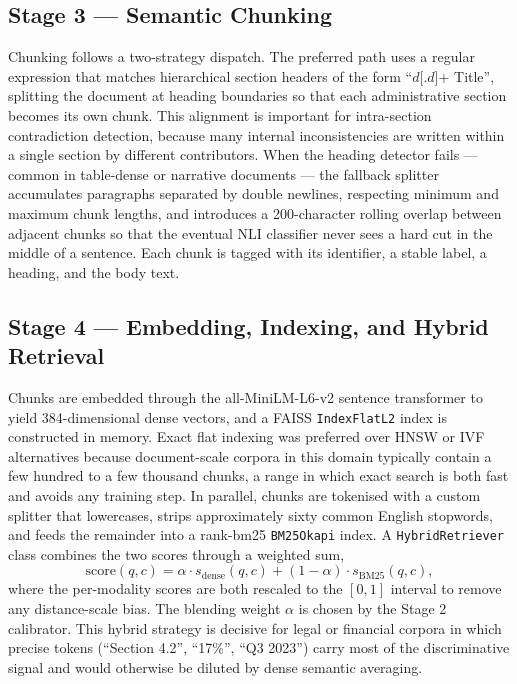 \documentclass[conference]{IEEEtran}
\begin{document}
\subsection{Stage 3 --- Semantic Chunking}
Chunking follows a two-strategy dispatch. The preferred path uses a regular expression that matches hierarchical section headers of the form ``$d$[.$d$]+ Title'', splitting the document at heading boundaries so that each administrative section becomes its own chunk. This alignment is important for intra-section contradiction detection, because many internal inconsistencies are written within a single section by different contributors. When the heading detector fails --- common in table-dense or narrative documents --- the fallback splitter accumulates paragraphs separated by double newlines, respecting minimum and maximum chunk lengths, and introduces a 200-character rolling overlap between adjacent chunks so that the eventual NLI classifier never sees a hard cut in the middle of a sentence. Each chunk is tagged with its identifier, a stable label, a heading, and the body text.
\subsection{Stage 4 --- Embedding, Indexing, and Hybrid Retrieval}
Chunks are embedded through the all-MiniLM-L6-v2 sentence transformer to yield 384-dimensional dense vectors, and a FAISS \texttt{IndexFlatL2} index is constructed in memory. Exact flat indexing was preferred over HNSW or IVF alternatives because document-scale corpora in this domain typically contain a few hundred to a few thousand chunks, a range in which exact search is both fast and avoids any training step. In parallel, chunks are tokenised with a custom splitter that lowercases, strips approximately sixty common English stopwords, and feeds the remainder into a rank-bm25 \texttt{BM25Okapi} index. A \texttt{HybridRetriever} class combines the two scores through a weighted sum,
\begin{equation}
\text{score}(q, c) = \alpha \cdot s_{\text{dense}}(q, c) + (1-\alpha) \cdot s_{\text{BM25}}(q, c),
\label{eq:hybrid}
\end{equation}
where the per-modality scores are both rescaled to the $[0,1]$ interval to remove any distance-scale bias. The blending weight $\alpha$ is chosen by the Stage 2 calibrator. This hybrid strategy is decisive for legal or financial corpora in which precise tokens (``Section 4.2'', ``17\%'', ``Q3 2023'') carry most of the discriminative signal and would otherwise be diluted by dense semantic averaging.
\end{document}
